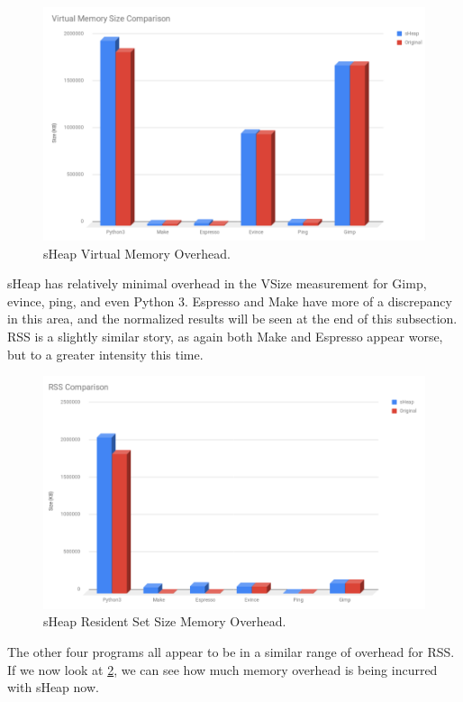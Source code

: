\documentclass[conference]{IEEEtran}
\begin{document}
\begin{figure}[htbp]
  \centering
  \includegraphics[width=\linewidth]{sheap-vsize-overhead-graph.png}
  \caption{sHeap Virtual Memory Overhead.}
  \label{fig:sheap-vsize-graph}
\end{figure}

sHeap has relatively minimal overhead in the VSize measurement for Gimp, evince, ping, 
and even Python 3. Espresso and Make have more of a discrepancy in this area, and the 
normalized results will be seen at the end of this subsection. RSS is a slightly similar 
story, as again both Make and Espresso appear worse, but to a greater intensity this time.

\begin{figure}[htbp]
  \centering
  \includegraphics[width=\linewidth]{sheap-rss-overhead-graph.png}
  \caption{sHeap Resident Set Size Memory Overhead.}
  \label{fig:sheap-rss-graph}
\end{figure}

The other four programs all appear to be in a similar range of overhead for RSS. If we now look at 
\ref{fig:sheap-rss-graph}, we can see how much memory overhead is being incurred with sHeap now. 
\end{document}
